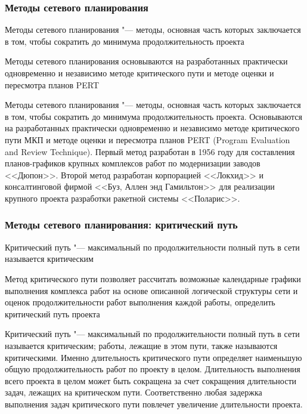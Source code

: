 \documentclass{../industrial-development}
\begin{document}
    \begin{frame} \frametitle{Методы сетевого планирования}
        \begin{definition}
            \alert{Методы сетевого планирования} "--- методы, основная часть которых заключается в том, чтобы сократить до минимума продолжительность проекта
        \end{definition} 
        Методы сетевого планирования основываются на разработанных практически одновременно и независимо методе критического пути и методе оценки и пересмотра планов PERT
    \end{frame}
    \lecturenotes

Методы сетевого планирования "--- методы, основная часть которых заключается в том, чтобы сократить до минимума продолжительность проекта. Основываются на разработанных практически одновременно и независимо методе критического пути МКП и методе оценки и пересмотра планов PERT (Program Evaluation and Review Technique). Первый метод разработан в 1956 году для составления планов-графиков крупных комплексов работ по модернизации заводов <<Дюпон>>. Второй метод разработан корпорацией <<Локхид>> и консалтинговой фирмой <<Буз, Аллен энд Гамильтон>> для реализации крупного проекта разработки ракетной системы <<Поларис>>.

    \begin{frame} \frametitle{Методы сетевого планирования: критический путь}
        \begin{definition}
            \alert{Критический путь} "--- максимальный по продолжительности полный путь в сети называется критическим
        \end{definition}
        \begin{definition}
          Метод критического пути позволяет рассчитать возможные календарные графики выполнения комплекса работ на основе описанной логической структуры сети и оценок продолжительности работ выполнения каждой работы, определить критический путь проекта
        \end{definition}
    \end{frame}
    \lecturenotes

Критический путь "--- максимальный по продолжительности полный путь в сети называется критическим; работы, лежащие в этом пути, также называются критическими. Именно длительность критического пути определяет наименьшую общую продолжительность работ по проекту в целом. Длительность выполнения всего проекта в целом может быть сокращена за счет сокращения длительности задач, лежащих на критическом пути. Соответственно любая задержка выполнения задач критического пути повлечет увеличение длительности проекта.
\end{document}
